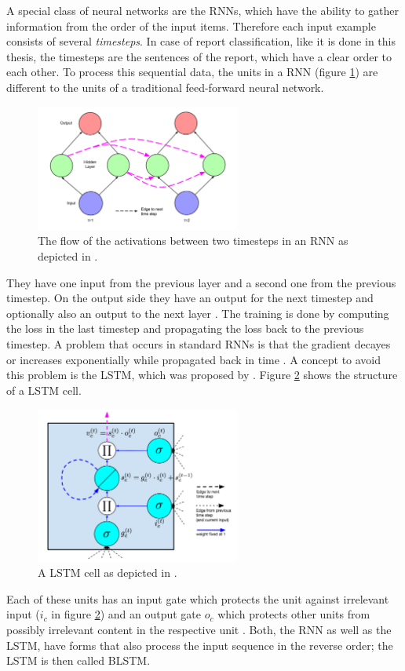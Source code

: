 A special class of neural networks are the \acp{RNN}, which have the ability to gather information from the order of the input items.
Therefore each input example consists of several \textit{timesteps}.
In case of report classification, like it is done in this thesis, the timesteps are the sentences of the report, which have a clear order to each other.
To process this sequential data, the units in a \acs{RNN} (figure \ref{figure:rnn_unfolded}) are different to the units of a traditional feed-forward neural network.
\begin{figure}[h]
    \centering
    \includegraphics[width=0.6\textwidth]{figures/rnn_unfolded.png}
    \caption{The flow of the activations between two timesteps in an RNN as depicted in \cite[p. 12]{Lipton2015}.}
    \label{figure:rnn_unfolded}
\end{figure}
They have one input from the previous layer and a second one from the previous timestep.
On the output side they have an output for the next timestep and optionally also an output to the next layer \cite[p. 373]{Goodfellow2016}.
The training is done by computing the loss in the last timestep and propagating the loss back to the previous timestep.
A problem that occurs in standard \acp{RNN} is that the gradient decayes or increases exponentially while propagated back in time \cite[p. 13]{Lipton2015}.
A concept to avoid this problem is the \acs{LSTM}, which was proposed by \cite{Hochreiter1997}.
Figure \ref{figure:lstm_cell} shows the structure of a LSTM cell.
\begin{figure}[h]
    \centering
    \includegraphics[width=0.6\textwidth]{figures/lstm_cell.png}
    \caption{A LSTM cell as depicted in \cite[p. 17]{Lipton2015}.}
    \label{figure:lstm_cell}
\end{figure}
Each of these units has an input gate which protects the unit against irrelevant input ($i_c$ in figure \ref{figure:lstm_cell}) and an output gate $o_c$ which protects other units from possibly irrelevant content in the respective unit \cite[p. 6]{Hochreiter1997}.
Both, the \ac{RNN} as well as the \ac{LSTM}, have forms that also process the input sequence in the reverse order; the \ac{LSTM} is then called \ac{BLSTM}.

